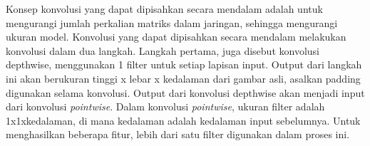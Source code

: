 Konsep konvolusi yang dapat dipisahkan secara mendalam adalah untuk mengurangi jumlah perkalian matriks dalam jaringan, sehingga mengurangi ukuran model. Konvolusi yang dapat dipisahkan secara mendalam melakukan konvolusi dalam dua langkah. Langkah pertama, juga disebut konvolusi depthwise, menggunakan 1 filter untuk setiap lapisan input. Output dari langkah ini akan berukuran tinggi x lebar x kedalaman dari gambar asli, asalkan padding digunakan selama konvolusi. Output dari konvolusi depthwise akan menjadi input dari konvolusi \textit{pointwise}. Dalam konvolusi \textit{pointwise}, ukuran filter adalah 1x1xkedalaman, di mana kedalaman adalah kedalaman input sebelumnya. Untuk menghasilkan beberapa fitur, lebih dari satu filter digunakan dalam proses ini.
\cite{rismiyati2020xception}




